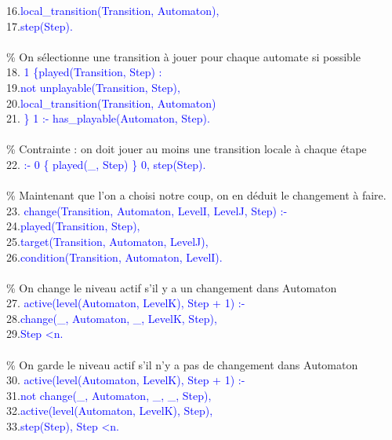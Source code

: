 \documentclass[10pt,a4paper]{article}
\begin{document}
{	16.\qquad\qquad\textcolor{blue}{local\_transition(Transition, Automaton),}\\
	17.\qquad\qquad\textcolor{blue}{step(Step).}\\ \\
	\% On sélectionne une transition à jouer pour chaque automate si possible\\
	18. \textcolor{blue}{1 \{played(Transition, Step) :}\\
	19.\qquad\qquad\textcolor{blue}{not unplayable(Transition, Step),}\\
	20.\qquad\qquad\textcolor{blue}{local\_transition(Transition, Automaton)}\\
	21. \textcolor{blue}{\} 1 :- has\_playable(Automaton, Step).}\\ \\
	\% Contrainte : on doit jouer au moins une transition locale à chaque étape\\
	22. \textcolor{blue}{:- 0 \{ played(\_, Step) \} 0, step(Step).}\\ \\
	\% Maintenant que l'on a choisi notre coup, on en déduit le changement à faire.\\
	23. \textcolor{blue}{change(Transition, Automaton, LevelI, LevelJ, Step) :-}\\
	24.\qquad\qquad\textcolor{blue}{played(Transition, Step),}\\
	25.\qquad\qquad\textcolor{blue}{target(Transition, Automaton, LevelJ),}\\
	26.\qquad\qquad\textcolor{blue}{condition(Transition, Automaton, LevelI).}\\ \\
	\% On change le niveau actif s'il y a un changement dans Automaton\\
	27. \textcolor{blue}{active(level(Automaton, LevelK), Step + 1) :-}\\
	28.\qquad\qquad\textcolor{blue}{change(\_, Automaton, \_, LevelK, Step),}\\
	29.\qquad\qquad\textcolor{blue}{Step \textless n.}\\ \\
	\% On garde le niveau actif s'il n'y a pas de changement dans Automaton\\
	30. \textcolor{blue}{active(level(Automaton, LevelK), Step + 1) :-}\\
	31.\qquad\qquad\textcolor{blue}{not change(\_, Automaton, \_, \_, Step),}\\
	32.\qquad\qquad\textcolor{blue}{active(level(Automaton, LevelK), Step),}\\
	33.\qquad\qquad\textcolor{blue}{step(Step), Step \textless n.}\\ \\
}
\end{document}
